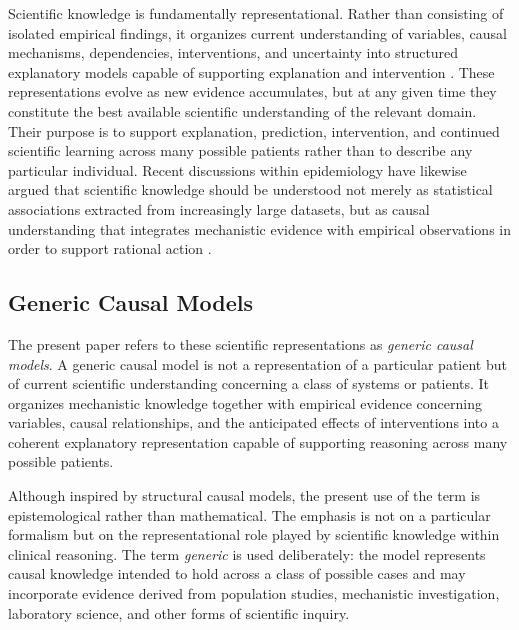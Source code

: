 \documentclass[11pt]{article}
\begin{document}
Scientific knowledge is fundamentally representational. Rather than consisting of isolated empirical findings, it organizes current understanding of variables, causal mechanisms, dependencies, interventions, and uncertainty into structured explanatory models capable of supporting explanation and intervention \parencite{woodward_making_2005}. These representations evolve as new evidence accumulates, but at any given time they constitute the best available scientific understanding of the relevant domain. Their purpose is to support explanation, prediction, intervention, and continued scientific learning across many possible patients rather than to describe any particular individual. Recent discussions within epidemiology have likewise argued that scientific knowledge should be understood not merely as statistical associations extracted from increasingly large datasets, but as causal understanding that integrates mechanistic evidence with empirical observations in order to support rational action \parencite{kriebel_effective_2026}.

\subsection{Generic Causal Models}

The present paper refers to these scientific representations as \emph{generic causal models}. A generic causal model is not a representation of a particular patient but of current scientific understanding concerning a class of systems or patients. It organizes mechanistic knowledge together with empirical evidence concerning variables, causal relationships, and the anticipated effects of interventions into a coherent explanatory representation capable of supporting reasoning across many possible patients.

Although inspired by structural causal models, the present use of the term is epistemological rather than mathematical. The emphasis is not on a particular formalism but on the representational role played by scientific knowledge within clinical reasoning. The term \emph{generic} is used deliberately: the model represents causal knowledge intended to hold across a class of possible cases and may incorporate evidence derived from population studies, mechanistic investigation, laboratory science, and other forms of scientific inquiry.
\end{document}

